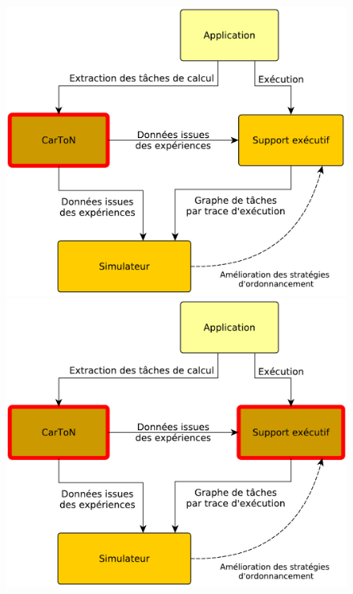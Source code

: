 \documentclass[xcolor={usenames,dvipsnames,svgnames,table}, aspectratio=43]{beamer}
\begin{document}
\begin{frame}
\begin{minipage}[t]{0.60\linewidth}
\begin{figure}
{	\includegraphics[width=\textwidth]{graph/big_picture-part1.pdf}%
      }%
       {%
	\includegraphics[width=\textwidth]{graph/big_picture-part1-2.pdf}%
      }%
       {%
}
\end{figure}
\end{minipage}
\end{frame}
\end{document}
